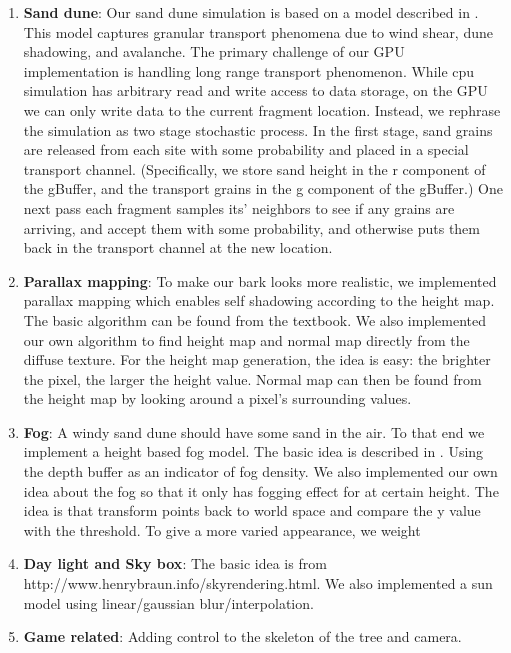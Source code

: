 \documentclass[annual]{acmsiggraph}
\begin{document}
\begin{enumerate}
\item{\textbf{Sand dune}: Our sand dune simulation is based on a model described in  \cite{momiji2002}.  This model captures granular transport phenomena due to wind shear, dune shadowing, and avalanche.  The primary challenge of our GPU implementation is handling long range transport phenomenon.  While cpu simulation has arbitrary read and write access to  data storage, on the GPU we can only write data to the current fragment location.  Instead, we rephrase the simulation as two stage stochastic process.  In the first stage, sand grains are released from each site with some probability  and placed in a special transport channel.  (Specifically, we store sand height in the r component of the gBuffer, and the transport grains in the g component of the gBuffer.)  One next pass each fragment samples its' neighbors to see if any grains are arriving, and accept them with some probability, and otherwise puts them back in the transport channel at the new location.}
\item{\textbf{Parallax mapping}: To make our bark looks more realistic, we implemented parallax mapping which enables self shadowing according to the height map. The basic algorithm can be found from the textbook. We also implemented our own algorithm to find height map and normal map directly from the diffuse texture. For the height map generation, the idea is easy: the brighter the pixel, the larger the height value. Normal map can then be found from the height map by looking around a pixel's surrounding values.}
\item{\textbf{Fog}: A windy sand dune should have some sand in the air. To that end we implement a height based fog model. The basic idea is described in \cite{hoffman2008}. Using the depth buffer as an indicator of fog density. We also implemented our own idea about the fog so that it only has fogging effect for at certain height. The idea is that transform points back to world space and compare the y value with the threshold.  To give a more varied appearance,  we weight }
\item{\textbf{Day light and Sky box}: The basic idea is from http://www.henrybraun.info/skyrendering.html. We also implemented a sun model using linear/gaussian blur/interpolation.}
\item{\textbf{Game related}: Adding control to the skeleton of the tree and camera. }
\end{enumerate}
\end{document}
